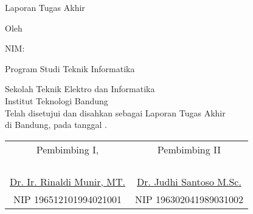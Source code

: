\clearpage
\pagestyle{empty}

\begin{center}
\smallskip

    \large \bfseries \MakeUppercase{\thetitle}
    \vfill

    \large Laporan Tugas Akhir
    \vfill

    \normalsize Oleh

    \large \theauthor

    \large NIM: \thestudentnumber

    \large Program Studi Teknik Informatika

    \normalsize \normalfont Sekolah Teknik Elektro dan Informatika \\
    Institut Teknologi Bandung \\

    \vfill
    \normalsize \normalfont
    Telah disetujui dan disahkan sebagai Laporan Tugas Akhir
    \\[0.1em]
    di Bandung, pada tanggal \thedatedmy.

    \vfill
    \setlength{\tabcolsep}{12pt}
    \begin{tabular}{c@{\hskip 0.5in}c}
        Pembimbing I, & Pembimbing II \\
        & \\
        & \\
        & \\
        & \\
        \underline{Dr. Ir. Rinaldi Munir, MT.} & \underline{Dr. Judhi Santoso M.Sc.} \\
        NIP 196512101994021001 & NIP 196302041989031002 \\
    \end{tabular}

\end{center}
\clearpage
